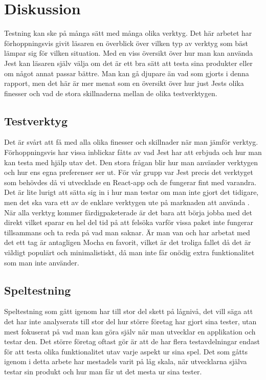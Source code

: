 \section{Diskussion}
\label{sec:david-discussion}
Testning kan ske på många sätt med många olika verktyg. Det här arbetet har förhoppningsvis givit läsaren en överblick över vilken typ av verktyg som bäst lämpar sig för vilken situation. Med en viss översikt över hur man kan använda Jest kan läsaren själv välja om det är ett bra sätt att testa sina produkter eller om något annat passar bättre. Man kan gå djupare än vad som gjorts i denna rapport, men det här är mer menat som en översikt över hur just Jests olika finesser och vad de stora skillnaderna mellan de olika testverktygen.

\subsection{Testverktyg} 
\label{subsec:david-discussion-jest}
Det är svårt att få med alla olika finesser och skillnader när man jämför verktyg. Förhoppningsvis har vissa inblickar fåtts av vad Jest har att erbjuda och hur man kan testa med hjälp utav det. Den stora frågan blir hur man använder verktygen och hur ens egna preferenser ser ut. För vår grupp var Jest precis det verktyget som behövdes då vi utvecklade en React-app och de fungerar fint med varandra. Det är lite lurigt att sätta sig in i hur man testar om man inte gjort det tidigare, men det ska vara ett av de enklare verktygen ute på marknaden att använda \cite{bib-jest-easy}. När alla verktyg kommer färdigpaketerade är det bara att börja jobba med det direkt vilket sparar en hel del tid på att felsöka varför vissa paket inte fungerar tillsammans och ta reda på vad man saknar. Är man van och har arbetat med det ett tag är antagligen Mocha en favorit, vilket är det troliga fallet då det är väldigt populärt och minimalistiskt, då man inte får onödig extra funktionalitet som man inte använder. 

\subsection{Speltestning}
\label{subsec:david-discussion-speltestning}
Speltestning som gått igenom har till stor del skett på lågnivå, det vill säga att det har inte analyserats till stor del hur större företag har gjort sina tester, utan mest fokuserat på vad man kan göra själv när man utvecklar en applikation och testar den. Det större företag oftast gör är att de har flera testavdelningar endast för att testa olika funktionalitet utav varje aspekt ur sina spel. Det som gåtts igenom i detta arbete har mestadels varit på låg skala, när utvecklarna själva testar sin produkt och hur man får ut det mesta ur sina tester. 